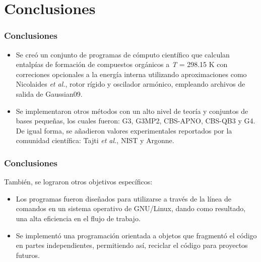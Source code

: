 \documentclass{beamer}
\begin{document}
\section{Conclusiones}
\begin{frame}
\frametitle{Conclusiones}

\begin{itemize}

\item Se creó un conjunto de programas de cómputo científico que calculan entalpías de formación de compuestos orgánicos a \textit{T} = 298.15 K con correciones opcionales a la energía interna utilizando aproximaciones como Nicolaides \textit{et al.}, rotor rígido y oscilador armónico, empleando archivos de salida de Gaussian09.

\vspace{1cm}

\item Se implementaron otros métodos con un alto nivel de teoría y conjuntos de bases pequeñas, los cuales fueron: G3, G3MP2, CBS-APNO, CBS-QB3 y G4. De igual forma, se añadieron valores experimentales reportados por la comunidad científica: Tajti \textit{et al.}, NIST y Argonne.

\end{itemize}
\end{frame}

\begin{frame}
\frametitle{Conclusiones}
También, se lograron otros objetivos específicos:
\vspace{1cm}

\begin{itemize}
\item Los programas fueron diseñados para utilizarse a través de la línea de comandos en un sistema operativo de GNU/Linux, dando como resultado, una alta eficiencia en el flujo de trabajo.

\item Se implementó una programación orientada a objetos que fragmentó el código en partes independientes, permitiendo así, reciclar el código para proyectos futuros.
\end{itemize}
\end{frame}
\end{document}
